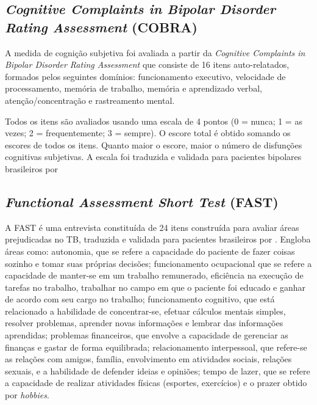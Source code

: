 \documentclass[chapter=TITLE,
               oneside,
               12pt,
               a4paper,
               english,
               brazil]{abntex2}    %
\begin{document}
    
        \subsection{\textit{Cognitive Complaints in Bipolar Disorder Rating Assessment} 
        (COBRA)}
        \label{sec:cobra}
    
            A medida de cognição subjetiva foi avaliada a partir da
            \textit{Cognitive Complaints in Bipolar Disorder Rating Assessment}
            que consiste de 16 itens auto-relatados, formados pelos seguintes domínios:
            funcionamento executivo, velocidade de processamento, memória de trabalho,
            memória e aprendizado verbal, atenção/concentração e rastreamento mental.
    
            Todos os itens são avaliados usando uma escala de 4 pontos
            (0 = nunca; 1 = as vezes; 2 = frequentemente; 3 = sempre).
            O escore total é obtido somando os escores de todos os itens.
            Quanto maior o escore, maior o número de disfunções cognitivas subjetivas.
            A escala foi traduzida e validada para pacientes bipolares brasileiros
            por \textcite{lima_validity_2018}
    
        \subsection{\textit{Functional Assessment Short Test} (FAST)}
        \label{sec:fast}
    
            A FAST é uma entrevista constituída de 24 itens construída para avaliar
            áreas prejudicadas no TB, traduzida e validada para pacientes brasileiros
            por \textcite{cacilhas_validity_2009}.
            Engloba áreas como: autonomia, que se refere a capacidade do paciente de
            fazer coisas sozinho e tomar suas próprias decisões; funcionamento
            ocupacional que se refere a capacidade de manter-se em um trabalho
            remunerado, eficiência na execução de tarefas no trabalho, trabalhar
            no campo em que o paciente foi educado e ganhar de acordo com seu cargo
            no trabalho; funcionamento cognitivo, que está relacionado a habilidade
            de concentrar-se, efetuar cálculos mentais simples, resolver problemas,
            aprender novas informações e lembrar das informações aprendidas; problemas
            financeiros, que envolve a capacidade de gerenciar as finanças e gastar de
            forma equilibrada; relacionamento interpessoal, que refere-se as relações
            com amigos, família, envolvimento em atividades sociais, relações sexuais,
            e a habilidade de defender ideias e opiniões; tempo de lazer, que se refere
            a capacidade de realizar atividades físicas (esportes, exercícios) e o prazer
            obtido por \textit{hobbies}.
    
\end{document}
